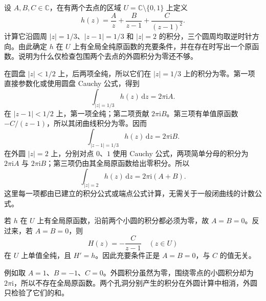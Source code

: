 \begin{exercise}\label{b3:ex:02-5}
设 \(A,B,C\in\mathbb C\)，在有两个去点的区域
\(U=\mathbb C\setminus\{0,1\}\) 上定义
\[
  h(z)=\frac A z+\frac B{z-1}+\frac C{(z-1)^2}.
\]
计算它沿圆周 \(|z|=1/3\)、\(|z-1|=1/3\) 和 \(|z|=2\) 的积分，三个圆周均取逆时针方向。由此确定 \(h\) 在 \(U\) 上有全局全纯原函数的充要条件，并在存在时写出一个原函数。说明为什么仅检查包围两个去点的外圆积分为零还不够。
\end{exercise}
\begin{solution}
在圆盘 \(|z|<1/2\) 上，后两项全纯，所以它们在 \(|z|=1/3\) 上的积分为零。第一项直接参数化或使用圆盘 Cauchy 公式，得到
\[
  \int_{|z|=1/3}h(z)\,\mathrm{d}z=2\pi\mathrm{i}A.
\]
在 \(|z-1|<1/2\) 上，第一项全纯；第二项贡献 \(2\pi\mathrm{i}B\)。第三项有单值原函数 \(-C/(z-1)\)，所以其闭曲线积分为零。因而
\[
  \int_{|z-1|=1/3}h(z)\,\mathrm{d}z=2\pi\mathrm{i}B.
\]
在外圆 \(|z|=2\) 上，分别对点 \(0\)、\(1\) 使用 Cauchy 公式，两项简单分母的积分为 \(2\pi\mathrm{i}A\) 与 \(2\pi\mathrm{i}B\)；第三项仍由其全局原函数给出零积分。所以
\[
  \int_{|z|=2}h(z)\,\mathrm{d}z=2\pi\mathrm{i}(A+B).
\]
这里每一项都由已建立的积分公式或端点公式计算，无需关于一般闭曲线的计数公式。

若 \(h\) 在 \(U\) 上有全局原函数，沿前两个小圆的积分都必须为零，故 \(A=B=0\)。反过来，若 \(A=B=0\)，则
\[
  H(z)=-\frac C{z-1}\quad(z\in U)
\]
在 \(U\) 上单值全纯，且 \(H'=h\)。因此充要条件正是 \(A=B=0\)，与 \(C\) 的值无关。

例如取 \(A=1\)、\(B=-1\)、\(C=0\)。外圆积分虽然为零，围绕零点的小圆积分却为 \(2\pi\mathrm{i}\)，所以不存在全局原函数。两个孔洞分别产生的积分在外圆计算中相消，外圆只检验了它们的和。
\end{solution}

